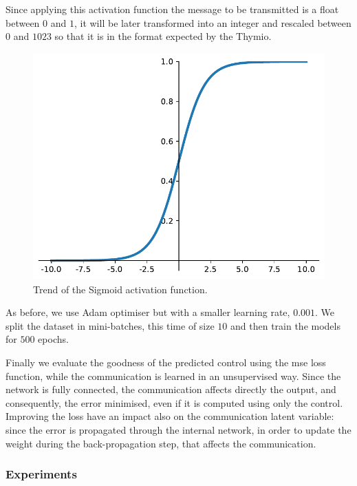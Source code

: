 \noindent
Since applying this activation function the message to be transmitted is a float 
between $0$ and $1$, it will be later transformed into an integer and rescaled 
between $0$ and $1023$ so that it is in the format expected by the Thymio.

\begin{figure}[htb]
	\centering
	\includegraphics[width=.5\textwidth]{contents/images/sigmoid2}%
	\caption{Trend of the Sigmoid activation function.}
	\label{fig:sigmoid}
\end{figure}

As before, we use Adam optimiser but with a smaller learning rate, $0.001$. We 
split the dataset in mini-batches, this time of size $10$ and then train the models 
for $500$ epochs. 

Finally we evaluate the goodness of the predicted control using the \gls{mse} loss 
function, while the communication is learned in an unsupervised way.
Since the network is fully connected, the communication affects directly the 
output, and consequently, the error minimised, even if it is computed using only 
the control. Improving the loss have an impact also on the communication latent 
variable: since the error is propagated through the internal network, in order to 
update the weight during the back-propagation step, that affects the 
communication.

\subsubsection{Experiments}
\label{subsubsec:expcomm}
